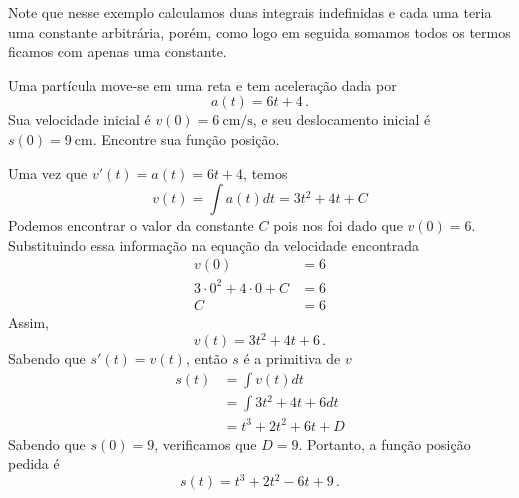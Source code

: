 Note que nesse exemplo calculamos duas integrais indefinidas e cada uma
teria uma constante arbitrária, porém, como logo em seguida somamos todos
os termos ficamos com apenas uma constante.

\begin{example}
  Uma partícula move-se em uma reta e tem aceleração dada por
  \[
    a(t) = 6t + 4 \,.
  \]
  Sua velocidade inicial é $v(0) = \SI{6}{\centi\meter/\second}$,
  e seu deslocamento inicial é $s(0) = \SI{9}{\centi\meter}$.
  Encontre sua função posição.

  \solution
  Uma vez que \( v'(t) = a(t)=6t+4 \), temos
  \[
    v(t) = \int a(t) dt = 3t^2 + 4t + C
  \]
  Podemos encontrar o valor da constante $C$ pois nos foi dado que $v(0)=6$.
  Substituindo essa informação na equação da velocidade encontrada
  \begin{align*}
    v(0) & = 6 \\
    3 \cdot 0^2 + 4 \cdot 0 + C & = 6 \\
    C & = 6
  \end{align*}
  Assim,
  \[
    v(t) = 3t^2 + 4t + 6 \,.
  \]
  Sabendo que $s'(t)=v(t)$, então $s$ é a primitiva de $v$
  \begin{align*}
  s(t)
  & = \int v(t) dt \\[2mm]
  & = \int 3t^2 + 4t + 6 dt  \\[2mm]
  & = t^3 + 2t^2 + 6t + D
  \end{align*}
  Sabendo que $s(0) = 9$, verificamos que $D=9$.
  Portanto, a função posição pedida é
  \[
      s(t) = t^3 + 2t^2 - 6t + 9 \,.
  \]
\end{example}
